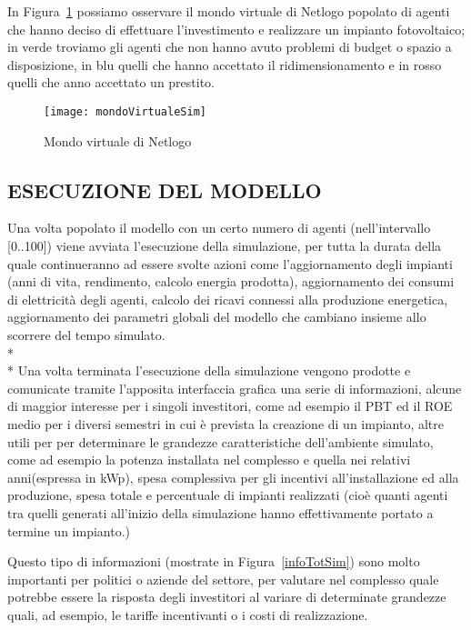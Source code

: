 \documentclass[12pt,a4paper,openright,twoside]{report}
\begin{document}
In Figura~\ref{mondoVirtualeSim} possiamo osservare il mondo virtuale di Netlogo popolato di agenti che hanno deciso di effettuare l'investimento e realizzare un impianto fotovoltaico; in verde troviamo gli agenti che non hanno avuto problemi di budget o spazio a disposizione, in blu quelli che hanno accettato il ridimensionamento e in rosso quelli che anno accettato un prestito.

\begin{figure}[hbt]
	\centering
	\texttt{[image: mondoVirtualeSim]}
	\caption{Mondo virtuale di Netlogo}
	\label{mondoVirtualeSim}
\end{figure}

\subsection{ESECUZIONE DEL MODELLO}

Una volta popolato il modello con un certo numero di agenti (nell'intervallo [0..100]) viene avviata l'esecuzione della simulazione, per tutta la durata della quale continueranno ad essere svolte azioni come l'aggiornamento degli impianti (anni di vita, rendimento, calcolo energia prodotta), aggiornamento dei consumi di elettricità degli agenti, calcolo dei ricavi connessi alla produzione energetica, aggiornamento dei parametri globali del modello che cambiano insieme allo scorrere del tempo simulato. 
\\* \\*
Una volta terminata l'esecuzione della simulazione vengono prodotte e comunicate tramite l'apposita interfaccia grafica una serie di informazioni, alcune di maggior interesse per i singoli investitori, come ad esempio il PBT ed il ROE medio per i diversi semestri in cui è prevista la creazione di un impianto, altre utili per  per determinare le grandezze caratteristiche dell'ambiente simulato, come ad esempio la potenza installata nel complesso e quella nei relativi anni(espressa in kWp), spesa complessiva per gli incentivi all'installazione ed alla produzione, spesa totale e percentuale di impianti realizzati (cioè quanti agenti tra quelli generati all'inizio della simulazione hanno effettivamente portato a termine un impianto.)

Questo tipo di informazioni (mostrate in Figura~\ref{infoTotSim}) sono molto importanti per politici o aziende del settore, per valutare nel complesso quale potrebbe essere la risposta degli investitori al variare di determinate grandezze quali, ad esempio, le tariffe incentivanti o i costi di realizzazione. 
\end{document}
